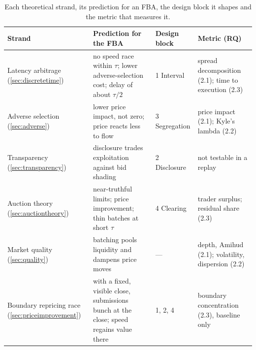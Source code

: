 \begin{table}[htbp]
\centering
\caption[From theory to design and measurement]{Each theoretical strand,
its prediction for an FBA, the design block it shapes and the metric that
measures it.}
\label{tab:theorylinks}
\small
\begin{tabularx}{\textwidth}{@{}p{2.6cm} L p{1.9cm} p{3.2cm}@{}}
\toprule
\textbf{Strand} & \textbf{Prediction for the FBA} & \textbf{Design block} & \textbf{Metric (RQ)}\\
\midrule
Latency arbitrage (\ref{sec:discretetime}) & no speed race within $\tau$; lower adverse-selection cost; delay of about $\tau/2$ & 1 Interval & spread decomposition (2.1); time to execution (2.3)\\
Adverse selection (\ref{sec:adverse}) & lower price impact, not zero; price reacts less to flow & 3 Segregation & price impact (2.1); Kyle's lambda (2.2)\\
Transparency (\ref{sec:transparency}) & disclosure trades exploitation against bid shading & 2 Disclosure & not testable in a replay\\
Auction theory (\ref{sec:auctiontheory}) & near-truthful limits; price improvement; thin batches at short $\tau$ & 4 Clearing & trader surplus; residual share (2.3)\\
Market quality (\ref{sec:quality}) & batching pools liquidity and dampens price moves & --- & depth, Amihud (2.1); volatility, dispersion (2.2)\\
Boundary repricing race (\ref{sec:priceimprovement}) & with a fixed, visible close, submissions bunch at the close; speed regains value there & 1, 2, 4 & boundary concentration (2.3), baseline only\\
\bottomrule
\end{tabularx}
\end{table}
